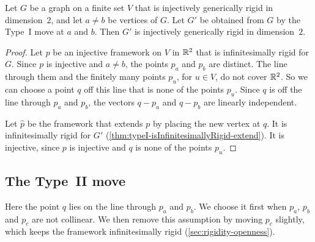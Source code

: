 \begin{theorem}
  \label{thm:typeI-isGenericallyRigidInj-two}
  \leanok
  Let $G$ be a graph on a finite set $V$ that is injectively
  generically rigid in dimension~$2$, and let $a \ne b$ be vertices of
  $G$. Let $G'$ be obtained from $G$ by the Type~I move at $a$ and
  $b$. Then $G'$ is injectively generically rigid in dimension~$2$.
\end{theorem}
\begin{proof}
  \leanok
  Let $p$ be an injective framework on $V$ in ${\mathbb{R}}^{2}$ that is
  infinitesimally rigid for $G$. Since $p$ is injective and
  $a \ne b$, the points $p_a$ and $p_b$ are distinct. The line through
  them and the finitely many points $p_u$, for $u \in V$, do not cover
  ${\mathbb{R}}^{2}$. So we can choose a point $q$ off this line that is none of
  the points $p_u$. Since $q$ is off the line through $p_a$ and
  $p_b$, the vectors $q - p_a$ and $q - p_b$ are linearly independent.

  Let $\hat p$ be the framework that extends $p$ by placing the new
  vertex at $q$. It is infinitesimally rigid for $G'$
  (\cref{thm:typeI-isInfinitesimallyRigid-extend}). It is injective,
  since $p$ is injective and $q$ is none of the points $p_u$.
\end{proof}

\subsection{The Type~II move}

Here the point $q$ lies on the line through $p_a$ and $p_b$. We choose
it first when $p_a$, $p_b$ and $p_c$ are not collinear. We then remove
this assumption by moving $p_c$ slightly, which keeps the framework
infinitesimally rigid (\cref{sec:rigidity-openness}).

